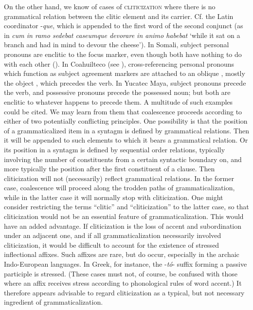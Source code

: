 On the other hand, we know of cases of \textsc{cliticization} where there is no grammatical relation between the clitic element and its carrier. Cf. the Latin coordinator -\textit{que}, which is appended to the first word of the second conjunct (as in \textit{cum in ramo sedebat caseumque devorare in animo habebat} ‘while it sat on a branch and had in mind to devour the cheese’). In Somali, subject personal pronouns are enclitic to the focus marker, even though both have nothing to do with each other (). In Coahuilteco (see \citealt{Troike1981}), cross-referencing personal pronouns which function as subject agreement markers are attached to an oblique \np, mostly the object \np, which precedes the verb. In Yucatec Maya, subject pronouns precede the verb, and possessive pronouns precede the possessed noun; but both are enclitic to whatever happens to precede them. A multitude of such examples could be cited. We may learn from them that coalescence proceeds according to either of two potentially conflicting principles. One possibility is that the position of a grammaticalized item in a syntagm is defined by grammatical relations. Then it will be appended to such elements to which it bears a grammatical relation. Or its position in a syntagm is defined by sequential order relations, typically involving the number of constituents from a certain syntactic boundary on, and more typically the position after the first constituent of a clause. Then cliticization will not (necessarily) reflect grammatical relations. In the former case, coalescence will proceed along the trodden paths of grammaticalization, while in the latter case it will normally stop with cliticization. One might consider restricting the terms ``clitic'' and ``cliticization'' to the latter case, so that cliticization would not be an essential feature of grammaticalization. This would have an added advantage. If cliticization is the loss of accent and subordination under an adjacent one, and if all grammaticalization necessarily involved cliticization, it would be difficult to account for the existence of stressed inflectional affixes. Such affixes are rare, but do occur, especially in the archaic Indo-European languages. In Greek, for instance, the -\textit{tó}{}- suffix forming a passive participle is stressed. (These cases must not, of course, be confused with those where an affix receives stress according to phonological rules of word accent.) It therefore appears advisable to regard cliticization as a typical, but not necessary ingredient of grammaticalization.

